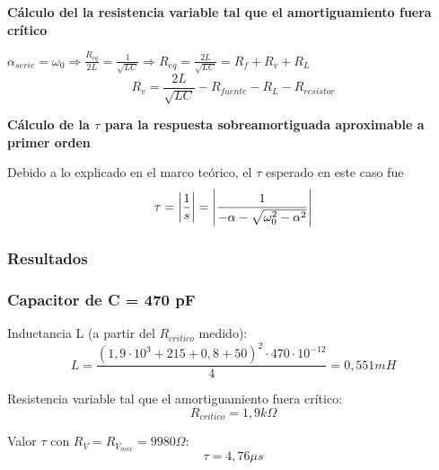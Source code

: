 \documentclass{article}
\begin{document}
            \textbf{Cálculo del la resistencia variable tal que el amortiguamiento fuera crítico} \par \par
            $ \alpha_{serie} = \omega_0 
            \Rightarrow \frac{R_{eq}}{2L} = \frac{1}{\sqrt{LC}} 
            \Rightarrow R_{eq} = \frac{2L}{\sqrt{LC}}= R_f + R_v + R_L
            $
            \begin{equation}
                R_v = \frac{2L}{\sqrt{LC}} - R_{fuente} - R_L - R_{resistor} 
            \end{equation}  \par

            \textbf{Cálculo de la $\tau$ para la respuesta sobreamortiguada aproximable a primer orden} \par
            Debido a lo explicado en el marco teórico, el $\tau$ esperado en este caso fue
            \begin{equation*}
               \tau = \abs{ \frac{1}{s} } = \abs{ \frac{1}{-\alpha-\sqrt{\omega_0^2 - \alpha^2}} }
            \end{equation*}
            
        \subsubsection*{Resultados}

            \subsubsection*{Capacitor de C = 470 pF}

                Inductancia L (a partir del $R_{critico}$ medido):
                \begin{equation*}
                    L=\frac{(1,9\cdot10^3 + 215 + 0,8 + 50)^2 \cdot 470 \cdot 10^{-12}}{4}= 0,551 mH
                \end{equation*} \par
                
                Resistencia variable tal que el amortiguamiento fuera crítico:
                \begin{equation*}
                    R_{critico} = 1,9 k\Omega
                \end{equation*} \par

        
                Valor $ \tau $ con $ R_V = R_{V_{max}} = 9980 \Omega $:
                 \begin{equation*}
                    \tau = 4,76 \mu s 
                \end{equation*}
\end{document}
